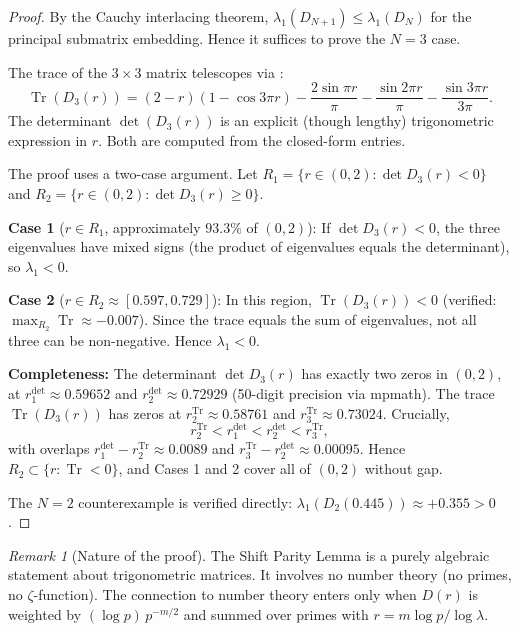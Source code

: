 \documentclass[12pt,a4paper]{article}
\theoremstyle{definition}
\theoremstyle{remark}
\newtheorem{remark}[theorem]{Remark}
\begin{document}
\begin{proof}
By the Cauchy interlacing theorem, $\lambda_1(D_{N+1}) \leq \lambda_1(D_N)$ for the principal submatrix embedding. Hence it suffices to prove the $N = 3$ case.

The trace of the $3 \times 3$ matrix telescopes via :
\[
  \operatorname{Tr}(D_3(r)) = (2-r)(1 - \cos 3\pi r) - \frac{2\sin\pi r}{\pi} - \frac{\sin 2\pi r}{\pi} - \frac{\sin 3\pi r}{3\pi}.
\]
The determinant $\det(D_3(r))$ is an explicit (though lengthy) trigonometric expression in $r$. Both are computed from the closed-form entries.

The proof uses a two-case argument. Let $R_1 = \{r \in (0,2) : \det D_3(r) < 0\}$ and $R_2 = \{r \in (0,2) : \det D_3(r) \geq 0\}$.

\medskip
\noindent\textbf{Case 1} ($r \in R_1$, approximately $93.3\%$ of $(0,2)$):
If $\det D_3(r) < 0$, the three eigenvalues have mixed signs (the product of eigenvalues equals the determinant), so $\lambda_1 < 0$.

\medskip
\noindent\textbf{Case 2} ($r \in R_2 \approx [0.597, 0.729]$):
In this region, $\operatorname{Tr}(D_3(r)) < 0$ (verified: $\max_{R_2}\operatorname{Tr} \approx -0.007$). Since the trace equals the sum of eigenvalues, not all three can be non-negative. Hence $\lambda_1 < 0$.

\medskip
\noindent\textbf{Completeness:}
The determinant $\det D_3(r)$ has exactly two zeros in $(0,2)$, at $r_1^{\det} \approx 0.59652$ and $r_2^{\det} \approx 0.72929$ (50-digit precision via mpmath). The trace $\operatorname{Tr}(D_3(r))$ has zeros at $r_2^{\operatorname{Tr}} \approx 0.58761$ and $r_3^{\operatorname{Tr}} \approx 0.73024$. Crucially,
\[
  r_2^{\operatorname{Tr}} < r_1^{\det} < r_2^{\det} < r_3^{\operatorname{Tr}},
\]
with overlaps $r_1^{\det} - r_2^{\operatorname{Tr}} \approx 0.0089$ and $r_3^{\operatorname{Tr}} - r_2^{\det} \approx 0.00095$.
Hence $R_2 \subset \{r : \operatorname{Tr} < 0\}$, and Cases 1 and 2 cover all of $(0,2)$ without gap.

The $N = 2$ counterexample is verified directly: $\lambda_1(D_2(0.445)) \approx +0.355 > 0$.
\end{proof}

\begin{remark}[Nature of the proof]
The Shift Parity Lemma is a purely algebraic statement about trigonometric matrices. It involves no number theory (no primes, no $\zeta$-function). The connection to number theory enters only when $D(r)$ is weighted by $(\log p)\,p^{-m/2}$ and summed over primes with $r = m\log p / \log\lambda$.
\end{remark}
\end{document}
